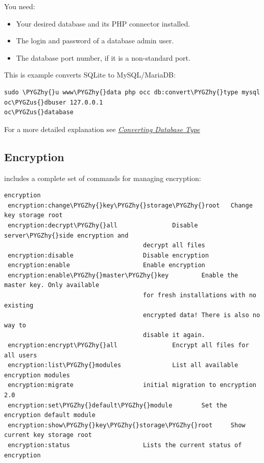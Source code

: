 \documentclass[letterpaper,10pt,english]{sphinxmanual}
\def\PYGZus{\char`\_}
\def\PYGZhy{\char`\-}
\begin{document}
You need:
\begin{itemize}
\item {} 
Your desired database and its PHP connector installed.

\item {} 
The login and password of a database admin user.

\item {} 
The database port number, if it is a non-standard port.

\end{itemize}

This is example converts SQLite to MySQL/MariaDB:

\begin{Verbatim}[commandchars=\\\{\}]
sudo \PYGZhy{}u www\PYGZhy{}data php occ db:convert\PYGZhy{}type mysql oc\PYGZus{}dbuser 127.0.0.1
oc\PYGZus{}database
\end{Verbatim}

For a more detailed explanation see
{\hyperref[configuration_database/db_conversion::doc]{\emph{\emph{Converting Database Type}}}}


\subsection{Encryption}
\label{configuration_server/occ_command:encryption}\label{configuration_server/occ_command:encryption-label}
 includes a complete set of commands for managing encryption:

\begin{Verbatim}[commandchars=\\\{\}]
encryption
 encryption:change\PYGZhy{}key\PYGZhy{}storage\PYGZhy{}root   Change key storage root
 encryption:decrypt\PYGZhy{}all               Disable server\PYGZhy{}side encryption and
                                      decrypt all files
 encryption:disable                   Disable encryption
 encryption:enable                    Enable encryption
 encryption:enable\PYGZhy{}master\PYGZhy{}key         Enable the master key. Only available
                                      for fresh installations with no existing
                                      encrypted data! There is also no way to
                                      disable it again.
 encryption:encrypt\PYGZhy{}all               Encrypt all files for all users
 encryption:list\PYGZhy{}modules              List all available encryption modules
 encryption:migrate                   initial migration to encryption 2.0
 encryption:set\PYGZhy{}default\PYGZhy{}module        Set the encryption default module
 encryption:show\PYGZhy{}key\PYGZhy{}storage\PYGZhy{}root     Show current key storage root
 encryption:status                    Lists the current status of encryption
\end{Verbatim}
\end{document}

